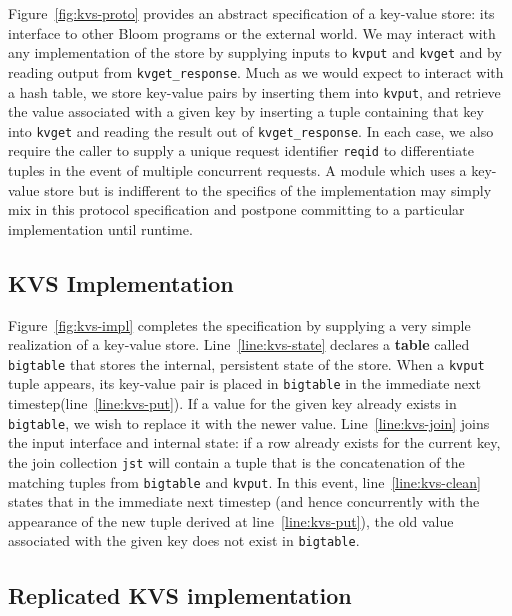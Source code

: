 Figure~\ref{fig:kvs-proto} provides an abstract specification of a key-value store:
its interface to other Bloom programs or the external world.  
We may interact with any implementation of the store
by supplying inputs to \texttt{kvput} and \texttt{kvget} and by reading output from
\texttt{kvget\_response}.  
Much as we would expect to interact
with a hash table, we store key-value pairs by inserting them into \texttt{kvput}, and 
retrieve the value associated with a given key by inserting a tuple containing that key
into \texttt{kvget} and reading the result out of \texttt{kvget\_response}.  In each case,
we also require the caller to supply a unique request identifier \texttt{reqid} to differentiate
tuples in the event of multiple concurrent requests.
A module which uses a key-value store but is indifferent
to the specifics of the implementation may simply mix in this protocol specification
and postpone committing to a particular implementation until runtime.



\subsection{KVS Implementation}

Figure~\ref{fig:kvs-impl} completes the specification by supplying a very simple
realization of a key-value store.  Line~\ref{line:kvs-state} declares a \textbf{table}
called \texttt{bigtable} that stores the internal, persistent state of the store.
When a \texttt{kvput} tuple appears, its key-value pair is placed in \texttt{bigtable} in the
immediate next timestep(line~\ref{line:kvs-put}).  If a value for the given key already 
exists in \texttt{bigtable}, we wish to replace it with the newer value.  Line~\ref{line:kvs-join}
joins the input interface and internal state: if a row already exists for the current key,  
the join collection \texttt{jst} will contain a tuple that is the concatenation of the matching
tuples from \texttt{bigtable} and \texttt{kvput}.  In this event, line~\ref{line:kvs-clean}
states that in the immediate next timestep (and hence concurrently with the appearance of the
new tuple derived at line~\ref{line:kvs-put}), the old value associated with the given key
does not exist in \texttt{bigtable}.  


\subsection{Replicated KVS implementation}

